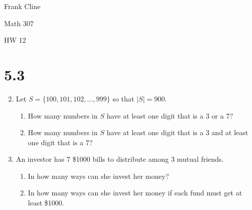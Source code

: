 \documentclass[12pt]{article}
\newcommand{\be}{\begin{enumerate}}
\newcommand{\ee}{\end{enumerate}}
\newcommand{\seti}[1]{\setcounter{enumi}{#1}}
\begin{document}
\onehalfspacing
\hfill Frank Cline

\hfill Math 307

\hfill HW 12


\section*{5.3}
\be

\seti{1}
\item Let $S=\{100,101,102,...,999\}$ so that $|S|=900$.
	\be
	\item How many numbers in $S$ have at least one digit that is a 3 or a 7?\\

	\item How many numbers in $S$ have at least one digit that is a 3 and at least one digit that is a 7?\\
		
	\ee
	
\seti{3}
\item An investor has 7 \$1000 bills to distribute among 3 mutual friends.
	\be
	\item In how many ways can she invest her money?\\
	
	
	\item In how many ways can she invest her money if each fund must get at least \$1000.\\
	
	
	\ee
	
\ee
\end{document}
